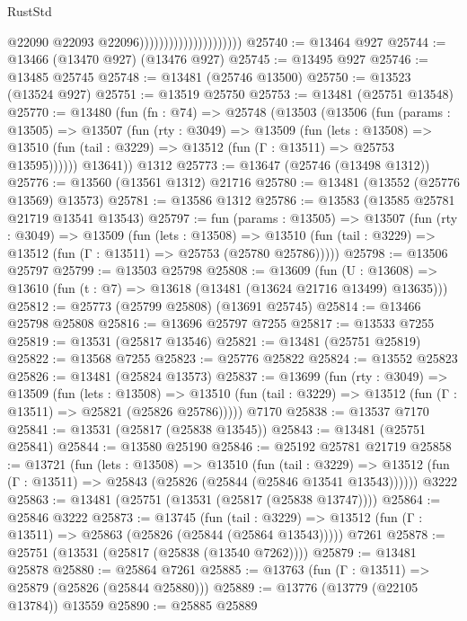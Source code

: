 \begin{lexlean}{RustStd}
\begin{coremodule}
                                              @22090
                                              @22093
                                              @22096)))))))))))))))))))))
@25740 := @13464 @927
@25744 := @13466 (@13470 @927) (@13476 @927)
@25745 := @13495 @927
@25746 := @13485 @25745
@25748 := @13481 (@25746 @13500)
@25750 := @13523 (@13524 @927)
@25751 := @13519 @25750
@25753 := @13481 (@25751 @13548)
@25770 := @13480
    (fun (fn : @74) =>
    @25748
      (@13503
        (@13506
          (fun (params : @13505) =>
          @13507
            (fun (rty : @3049) =>
            @13509
              (fun (lets : @13508) =>
              @13510 (fun (tail : @3229) => @13512 (fun (Γ : @13511) => @25753 @13595))))))
        @13641))
    @1312
@25773 := @13647 (@25746 (@13498 @1312))
@25776 := @13560 (@13561 @1312) @21716
@25780 := @13481 (@13552 (@25776 @13569) @13573)
@25781 := @13586 @1312
@25786 := @13583 (@13585 @25781 @21719 @13541 @13543)
@25797 := fun (params : @13505) =>
  @13507
    (fun (rty : @3049) =>
    @13509
      (fun (lets : @13508) =>
      @13510 (fun (tail : @3229) => @13512 (fun (Γ : @13511) => @25753 (@25780 @25786)))))
@25798 := @13506 @25797
@25799 := @13503 @25798
@25808 := @13609
    (fun (U : @13608) => @13610 (fun (t : @7) => @13618 (@13481 (@13624 @21716 @13499) @13635)))
@25812 := @25773 (@25799 @25808) (@13691 @25745)
@25814 := @13466 @25798 @25808
@25816 := @13696 @25797 @7255
@25817 := @13533 @7255
@25819 := @13531 (@25817 @13546)
@25821 := @13481 (@25751 @25819)
@25822 := @13568 @7255
@25823 := @25776 @25822
@25824 := @13552 @25823
@25826 := @13481 (@25824 @13573)
@25837 := @13699
    (fun (rty : @3049) =>
    @13509
      (fun (lets : @13508) =>
      @13510 (fun (tail : @3229) => @13512 (fun (Γ : @13511) => @25821 (@25826 @25786)))))
    @7170
@25838 := @13537 @7170
@25841 := @13531 (@25817 (@25838 @13545))
@25843 := @13481 (@25751 @25841)
@25844 := @13580 @25190
@25846 := @25192 @25781 @21719
@25858 := @13721
    (fun (lets : @13508) =>
    @13510
      (fun (tail : @3229) =>
      @13512 (fun (Γ : @13511) => @25843 (@25826 (@25844 (@25846 @13541 @13543))))))
    @3222
@25863 := @13481 (@25751 (@13531 (@25817 (@25838 @13747))))
@25864 := @25846 @3222
@25873 := @13745
    (fun (tail : @3229) => @13512 (fun (Γ : @13511) => @25863 (@25826 (@25844 (@25864 @13543)))))
    @7261
@25878 := @25751 (@13531 (@25817 (@25838 (@13540 @7262))))
@25879 := @13481 @25878
@25880 := @25864 @7261
@25885 := @13763 (fun (Γ : @13511) => @25879 (@25826 (@25844 @25880)))
@25889 := @13776 (@13779 (@22105 @13784)) @13559
@25890 := @25885 @25889

\end{coremodule}
\end{lexlean}
